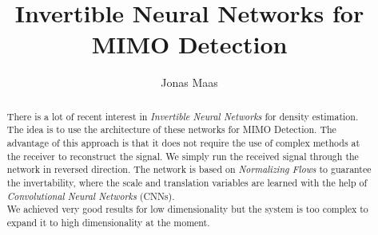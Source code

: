 \documentclass[oneside]{msvreport}%
\begin{document}
%
%
%
\title{Invertible Neural Networks for MIMO Detection}
\author{Jonas Maas}



%
\frontmatter
\maketitle
%
%
\begin{abstract}
There is a lot of recent interest in \emph{Invertible Neural Networks} for density estimation. The idea is to use the architecture of these networks for MIMO Detection. The advantage of this approach is that it does not require the use of complex methods at the receiver to reconstruct the signal. We simply run the received signal through the network in reversed direction. The network is based on \emph{Normalizing Flows} to guarantee the invertability, where the scale and translation variables are learned with the help of \emph{Convolutional Neural Networks} (CNNs).\\ We achieved very good results for low dimensionality but the system is too complex to expand it to high dimensionality at the moment.
\end{abstract}
%
%
\tableofcontents
%
%
%
\mainmatter
\end{document}

